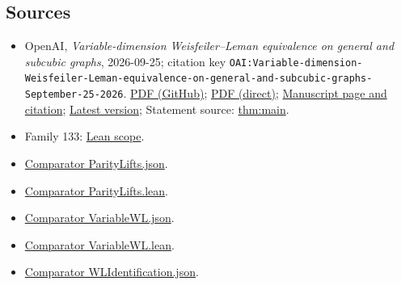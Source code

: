 \documentclass[11pt]{article}
\begin{document}
\subsection{Sources}
\begin{itemize}
\item OpenAI, \emph{Variable-dimension Weisfeiler–Leman equivalence on general and subcubic graphs}, 2026-09-25; citation key \texttt{OAI:Variable-dimension-Weisfeiler-Leman-equivalence-on-general-and-subcubic-graphs-September-25-2026}. \href{https://github.com/openai/math/blob/adc7f1241b42e322a6451854ab7e4b4c146bf78a/preprints/Variable-dimension-Weisfeiler-Leman-equivalence-on-general-and-subcubic-graphs-September-25-2026/paper.pdf}{PDF (GitHub)}; \href{https://github.com/openai/math/raw/adc7f1241b42e322a6451854ab7e4b4c146bf78a/preprints/Variable-dimension-Weisfeiler-Leman-equivalence-on-general-and-subcubic-graphs-September-25-2026/paper.pdf}{PDF (direct)}; \href{https://github.com/openai/math/blob/adc7f1241b42e322a6451854ab7e4b4c146bf78a/preprints/Variable-dimension-Weisfeiler-Leman-equivalence-on-general-and-subcubic-graphs-September-25-2026/README.md}{Manuscript page and citation}; \href{https://github.com/openai/math/blob/main/preprints/Variable-dimension-Weisfeiler-Leman-equivalence-on-general-and-subcubic-graphs-September-25-2026/paper.pdf}{Latest version}; Statement source: \href{https://github.com/openai/math/blob/adc7f1241b42e322a6451854ab7e4b4c146bf78a/preprints/Variable-dimension-Weisfeiler-Leman-equivalence-on-general-and-subcubic-graphs-September-25-2026/build/sections/01-introduction.tex\#L28}{thm:main}.
\item Family 133: \href{https://github.com/openai/math/blob/adc7f1241b42e322a6451854ab7e4b4c146bf78a/lean/docs/133.md}{Lean scope}.
\item \href{https://github.com/openai/math/blob/adc7f1241b42e322a6451854ab7e4b4c146bf78a/lean/ComparatorChallenges/ParityLifts.json}{Comparator ParityLifts.json}.
\item \href{https://github.com/openai/math/blob/adc7f1241b42e322a6451854ab7e4b4c146bf78a/lean/ComparatorChallenges/ParityLifts.lean}{Comparator ParityLifts.lean}.
\item \href{https://github.com/openai/math/blob/adc7f1241b42e322a6451854ab7e4b4c146bf78a/lean/ComparatorChallenges/VariableWL.json}{Comparator VariableWL.json}.
\item \href{https://github.com/openai/math/blob/adc7f1241b42e322a6451854ab7e4b4c146bf78a/lean/ComparatorChallenges/VariableWL.lean}{Comparator VariableWL.lean}.
\item \href{https://github.com/openai/math/blob/adc7f1241b42e322a6451854ab7e4b4c146bf78a/lean/ComparatorChallenges/WLIdentification.json}{Comparator WLIdentification.json}.

\end{itemize}
\end{document}
